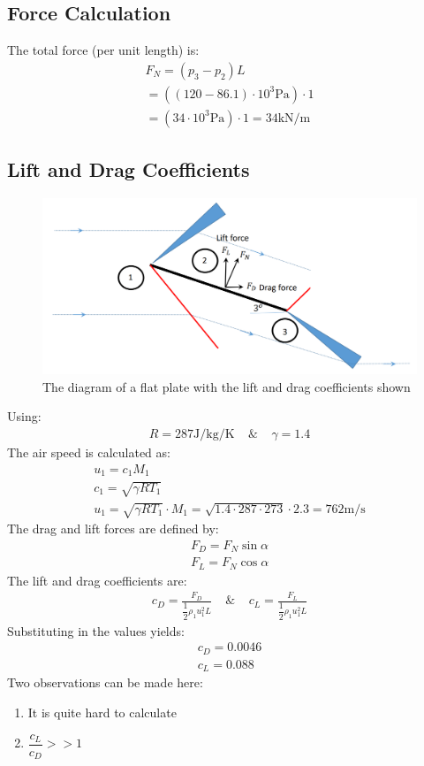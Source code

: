 \documentclass[class=report, crop=false, 12pt,a4paper]{standalone}
\begin{document}
\subsection{Force Calculation}
The total force (per unit length) is: 
\begin{gather}
    F_N = (p_3-p_2)L \\[5pt]
    = ((120-86.1)\cdot 10^3 \si{\pascal}) \cdot 1 \\[5pt]
    = (34\cdot 10^3\si{\pascal})\cdot 1 
    = 34\si{\kilo\newton\per\metre}
\end{gather}
\subsection{Lift and Drag Coefficients}
\begin{figure}[H]
    \centering
    \includegraphics[width = 0.95 \textwidth]{../img/diagram33.png}
    \caption{The diagram of a flat plate with the lift and drag coefficients shown}
\end{figure}
Using: 
\begin{gather}
    R = 287\si{\joule\per\kilogram\per\kelvin} \ \ \ \ \ \& \ \ \ \ \ 
    \gamma = 1.4
\end{gather}
The air speed is calculated as: 
\begin{gather}
    u_1 = c_1 M_1 \\[5pt]
    c_1 = \sqrt{\gamma R T_1} \\[5pt]
    u_1 = \sqrt{\gamma R T_1} \cdot M_1 = \sqrt{1.4\cdot 287\cdot 273}\cdot 2.3 = 762 \si{\metre\per\second}
\end{gather}
The drag and lift forces are defined by: 
\begin{gather}
    F_D = F_N \sin\alpha \\[5pt]
    F_L = F_N \cos\alpha
\end{gather}
The lift and drag coefficients are: 
\begin{gather}
    c_D = \frac{F_D}{\dfrac{1}{2}\rho_1 u_1^2 L} \ \ \ \ \ \& \ \ \ \ \
    c_L = \frac{F_L}{\dfrac{1}{2}\rho_1 u_1^2 L} 
\end{gather}
Substituting in the values yields: 
\begin{gather}
    c_D = 0.0046 \\[5pt]
    c_L = 0.088
\end{gather}
Two observations can be made here: 
\begin{enumerate}[noitemsep]
    \item It is quite hard to calculate
    \item $\dfrac{c_L}{c_D}>>1$
\end{enumerate}
\end{document}
